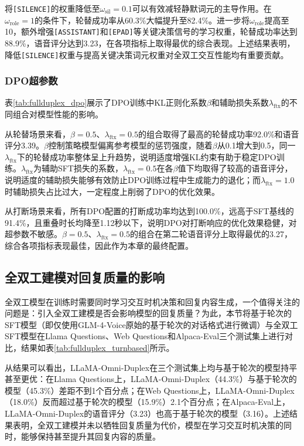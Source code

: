 将\texttt{[SILENCE]}的权重降低至$\omega_{\text{sil}} = 0.1$可以有效减轻静默词元的主导作用。在$\omega_{\text{role}} = 1$的条件下，轮替成功率从60.3\%大幅提升至82.4\%。进一步将$\omega_{\text{role}}$提高至10，额外增强\texttt{[ASSISTANT]}和\texttt{[EPAD]}等关键决策信号的学习权重，轮替成功率达到88.9\%，语音评分达到3.23，在各项指标上取得最优的综合表现。上述结果表明，降低\texttt{[SILENCE]}权重与提高关键决策词元权重对全双工交互性能均有重要贡献。

\subsubsection{DPO超参数}



表\ref{tab:fullduplex_dpo}展示了DPO训练中KL正则化系数$\beta$和辅助损失系数$\lambda_{\text{ftx}}$的不同组合对模型性能的影响。

从轮替场景来看，$\beta = 0.5$、$\lambda_{\text{ftx}} = 0.5$的组合取得了最高的轮替成功率92.0\%和语音评分3.39。$\beta$控制策略模型偏离参考模型的惩罚强度，随着$\beta$从0.1增大到0.5，同一$\lambda_{\text{ftx}}$下的轮替成功率整体呈上升趋势，说明适度增强KL约束有助于稳定DPO训练。$\lambda_{\text{ftx}}$为辅助SFT损失的系数，$\lambda_{\text{ftx}} = 0.5$在各$\beta$值下均取得了较高的语音评分，说明适度的辅助损失能够有效防止DPO训练过程中生成能力的退化；而$\lambda_{\text{ftx}} = 1.0$时辅助损失占比过大，一定程度上削弱了DPO的优化效果。

从打断场景来看，所有DPO配置的打断成功率均达到100.0\%，远高于SFT基线的91.4\%，且重叠时长均降至1.12秒以下，说明DPO对打断响应的优化效果稳健，对超参数不敏感。$\beta = 0.5$、$\lambda_{\text{ftx}} = 0.5$的组合在第二轮语音评分上取得最优的3.27，综合各项指标表现最佳，因此作为本章的最终配置。

\subsection{全双工建模对回复质量的影响}



全双工模型在训练时需要同时学习交互时机决策和回复内容生成，一个值得关注的问题是：引入全双工建模是否会影响模型的回复质量？为此，本节将基于轮次的SFT模型（即仅使用GLM-4-Voice原始的基于轮次的对话格式进行微调）与全双工SFT模型在Llama Questions、Web Questions和Alpaca-Eval三个测试集上进行对比，结果如表\ref{tab:fullduplex_turnbased}所示。

从结果可以看出，LLaMA-Omni-Duplex在三个测试集上均与基于轮次的模型持平甚至更优：在Llama Questions上，LLaMA-Omni-Duplex（44.3\%）与基于轮次的模型（45.3\%）差距不到1个百分点；在Web Questions上，LLaMA-Omni-Duplex（18.0\%）反而超过基于轮次的模型（15.9\%）2.1个百分点；在Alpaca-Eval上，LLaMA-Omni-Duplex的语音评分（3.23）也高于基于轮次的模型（3.16）。上述结果表明，全双工建模并未以牺牲回复质量为代价，模型在学习交互时机决策的同时，能够保持甚至提升其回复内容的质量。


